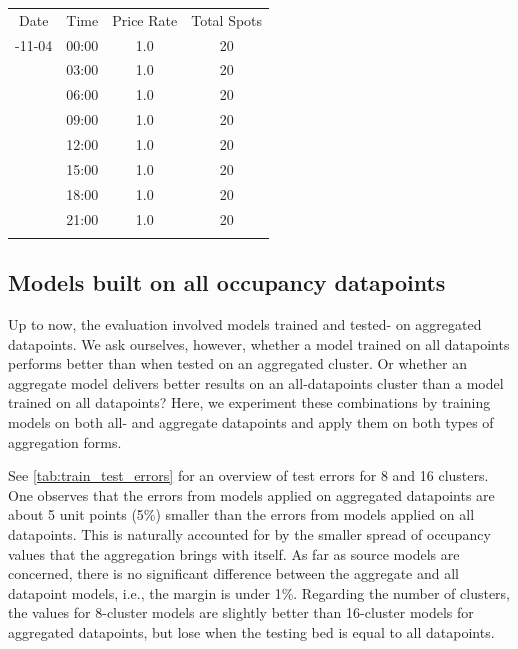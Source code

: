 	\begin{table}
		{\begin{tabular}{cccc}	
				\toprule
				Date & Time & Price Rate & Total Spots \\
				\colrule
				2017-11-04 & 	00:00 & 1.0 & 20 \\
				& 	03:00 & 1.0 & 20 \\
				& 	06:00 & 1.0 & 20 \\
				& 	09:00 & 1.0 & 20 \\
				& 	12:00 & 1.0 & 20 \\
				& 	15:00 & 1.0 & 20 \\
				& 	18:00 & 1.0 & 20 \\
				& 	21:00 & 1.0 & 20 \\
				\botrule
		\end{tabular}}
		\label{tab:ml_cwout}
	\end{table}
				
	\subsection{Models built on all occupancy datapoints}
	Up to now, the evaluation involved models trained and tested- on aggregated datapoints. 
	We ask ourselves, however, whether a model trained on all datapoints performs better than when tested on an aggregated cluster. Or whether an aggregate model delivers better results on an all-datapoints cluster than a model trained on all datapoints? Here, we experiment these combinations by training models on both all- and aggregate datapoints and apply them on both types of aggregation forms. 
	
	See \cref{tab:train_test_errors} for an overview of test errors for 8 and 16 clusters. One observes that the errors from models applied on aggregated datapoints are about 5 unit points (5\%) smaller than the errors from models applied on all datapoints. This is naturally accounted for by the smaller spread of occupancy values that the aggregation brings with itself. As far as source models are concerned, there is no significant difference between the aggregate and all datapoint models, i.e., the margin is under 1\%. Regarding the number of clusters, the values for 8-cluster models are slightly better than 16-cluster models for aggregated datapoints, but lose when the testing bed is equal to all datapoints.
	
